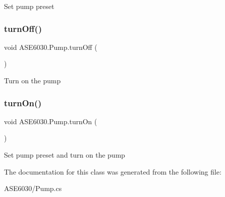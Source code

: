 Set pump preset 

\mbox{\label{class_a_s_e6030_1_1_pump_aeaca891e7c6220bf12e070c4096c8140}} 
\subsubsection{\texorpdfstring{turn\+Off()}{turnOff()}}
{\footnotesize\ttfamily void A\+S\+E6030.\+Pump.\+turn\+Off (\begin{DoxyParamCaption}{ }\end{DoxyParamCaption})\hspace{0.3cm}{\ttfamily [inline]}}



Turn on the pump 

\mbox{\label{class_a_s_e6030_1_1_pump_a80e39e01a6a3fdf187f743991004c4ed}} 
\subsubsection{\texorpdfstring{turn\+On()}{turnOn()}}
{\footnotesize\ttfamily void A\+S\+E6030.\+Pump.\+turn\+On (\begin{DoxyParamCaption}{ }\end{DoxyParamCaption})\hspace{0.3cm}{\ttfamily [inline]}}



Set pump preset and turn on the pump 



The documentation for this class was generated from the following file\+:\begin{DoxyCompactItemize}
\item 
A\+S\+E6030/Pump.\+cs\end{DoxyCompactItemize}

